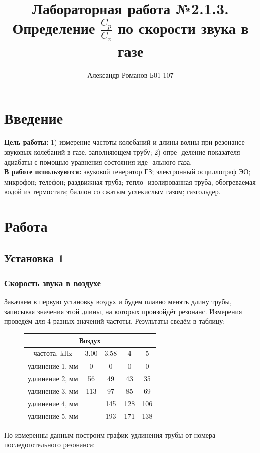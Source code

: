 \documentclass{article}
\author{Александр Романов Б01-107}
\date{}
\title{Лабораторная работа №2.1.3.\\Определение $\frac{C_p}{C_v}$ по скорости звука в газе}
\begin{document}
\maketitle

\section{Введение}

\textbf{Цель работы:} 1) измерение частоты колебаний и длины волны при
резонансе звуковых колебаний в газе, заполняющем трубу; 2) опре-
деление показателя адиабаты с помощью уравнения состояния иде-
ального газа.\\
\textbf{В работе используются:} звуковой генератор ГЗ; электронный
осциллограф ЭО; микрофон; телефон; раздвижная труба; тепло-
изолированная труба, обогреваемая водой из термостата; баллон
со сжатым углекислым газом; газгольдер.


\section{Работа}
\subsection{Установка 1}
\subsubsection{Скорость звука в воздухе}

Закачаем в первую установку воздух и будем плавно менять длину трубы, записывая значения этой длины, на которых 
произойдёт резонанс. Измерения проведём для 4 разных значений частоты. Результаты сведём в таблицу:
\begin{figure}[H]
    \centering
    \begin{tabular}{|c|c|c|c|c|}
        \hline
        \multicolumn{5}{|c|}{Воздух}                              \\\hline
        частота, kHz  & 3.00 &  3.58 & 4   & 5   \\\hline
        удлинение 1, мм & 0    &  0    & 0   & 0   \\\hline
        удлинение 2, мм & 56   &  49   & 43  & 35  \\\hline
        удлинение 3, мм & 113  &  97   & 85  & 69  \\\hline
        удлинение 4, мм &      & 145  & 128 & 106 \\\hline
        удлинение 5, мм &      & 193  & 171 & 138\\\hline
    \end{tabular}   
\end{figure}
По измеренны данным построим график удлинения трубы от номера последоготельного резонанса:
\end{document}
